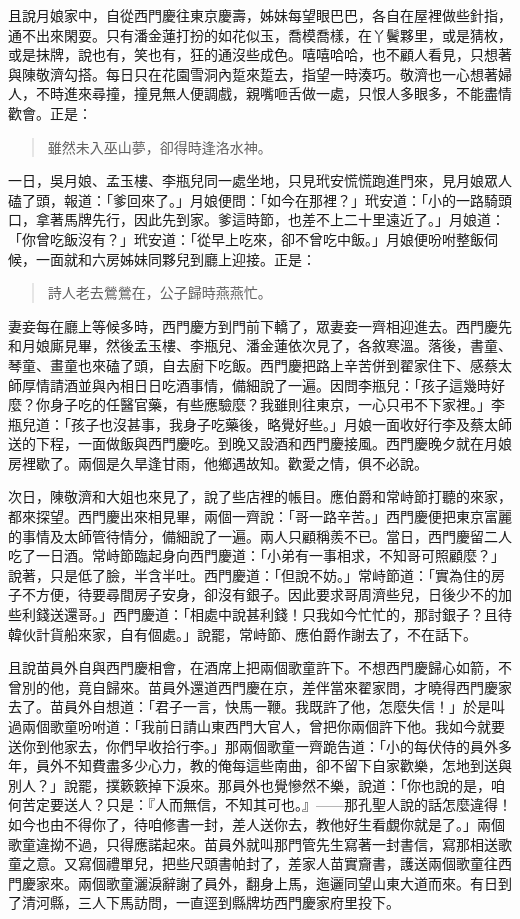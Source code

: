 且說月娘家中，自從西門慶往東京慶壽，姊妹每望眼巴巴，各自在屋裡做些針指，通不出來閑耍。只有潘金蓮打扮的如花似玉，喬模喬樣，在丫鬢夥里，或是猜枚，或是抹牌，說也有，笑也有，狂的通沒些成色。嘻嘻哈哈，也不顧人看見，只想著與陳敬濟勾搭。每日只在花園雪洞內踅來踅去，指望一時湊巧。敬濟也一心想著婦人，不時進來尋撞，撞見無人便調戲，親嘴咂舌做一處，只恨人多眼多，不能盡情歡會。正是：
\begin{quote}
雖然未入巫山夢，卻得時逢洛水神。
\end{quote}

一日，吳月娘、孟玉樓、李瓶兒同一處坐地，只見玳安慌慌跑進門來，見月娘眾人磕了頭，報道：「爹回來了。」月娘便問：「如今在那裡？」玳安道：「小的一路騎頭口，拿著馬牌先行，因此先到家。爹這時節，也差不上二十里遠近了。」月娘道：「你曾吃飯沒有？」玳安道：「從早上吃來，卻不曾吃中飯。」月娘便吩咐整飯伺候，一面就和六房姊妹同夥兒到廳上迎接。正是：
\begin{quote}
詩人老去鶯鶯在，公子歸時燕燕忙。
\end{quote}

妻妾每在廳上等候多時，西門慶方到門前下轎了，眾妻妾一齊相迎進去。西門慶先和月娘廝見畢，然後孟玉樓、李瓶兒、潘金蓮依次見了，各敘寒溫。落後，書童、琴童、畫童也來磕了頭，自去廚下吃飯。西門慶把路上辛苦併到翟家住下、感蔡太師厚情請酒並與內相日日吃酒事情，備細說了一遍。因問李瓶兒：「孩子這幾時好麼？你身子吃的任醫官藥，有些應驗麼？我雖則往東京，一心只弔不下家裡。」李瓶兒道：「孩子也沒甚事，我身子吃藥後，略覺好些。」月娘一面收好行李及蔡太師送的下程，一面做飯與西門慶吃。到晚又設酒和西門慶接風。西門慶晚夕就在月娘房裡歇了。兩個是久旱逢甘雨，他鄉遇故知。歡愛之情，俱不必說。

次日，陳敬濟和大姐也來見了，說了些店裡的帳目。應伯爵和常峙節打聽的來家，都來探望。西門慶出來相見畢，兩個一齊說：「哥一路辛苦。」西門慶便把東京富麗的事情及太師管待情分，備細說了一遍。兩人只顧稱羨不已。當日，西門慶留二人吃了一日酒。常峙節臨起身向西門慶道：「小弟有一事相求，不知哥可照顧麼？」說著，只是低了臉，半含半吐。西門慶道：「但說不妨。」常峙節道：「實為住的房子不方便，待要尋間房子安身，卻沒有銀子。因此要求哥周濟些兒，日後少不的加些利錢送還哥。」西門慶道：「相處中說甚利錢！只我如今忙忙的，那討銀子？且待韓伙計貨船來家，自有個處。」說罷，常峙節、應伯爵作謝去了，不在話下。

且說苗員外自與西門慶相會，在酒席上把兩個歌童許下。不想西門慶歸心如箭，不曾別的他，竟自歸來。苗員外還道西門慶在京，差伴當來翟家問，才曉得西門慶家去了。苗員外自想道：「君子一言，快馬一鞭。我既許了他，怎麼失信！」於是叫過兩個歌童吩咐道：「我前日請山東西門大官人，曾把你兩個許下他。我如今就要送你到他家去，你們早收拾行李。」那兩個歌童一齊跪告道：「小的每伏侍的員外多年，員外不知費盡多少心力，教的俺每這些南曲，卻不留下自家歡樂，怎地到送與別人？」說罷，撲簌簌掉下淚來。那員外也覺慘然不樂，說道：「你也說的是，咱何苦定要送人？只是：『人而無信，不知其可也。』——那孔聖人說的話怎麼違得！如今也由不得你了，待咱修書一封，差人送你去，教他好生看覷你就是了。」兩個歌童違拗不過，只得應諾起來。苗員外就叫那門管先生寫著一封書信，寫那相送歌童之意。又寫個禮單兒，把些尺頭書帕封了，差家人苗實齎書，護送兩個歌童往西門慶家來。兩個歌童灑淚辭謝了員外，翻身上馬，迤邐同望山東大道而來。有日到了清河縣，三人下馬訪問，一直逕到縣牌坊西門慶家府里投下。

